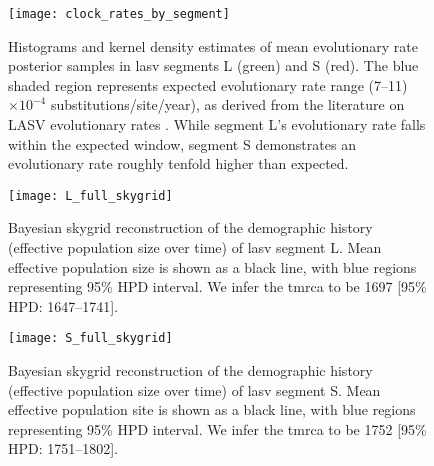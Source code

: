 \begin{figure}[ht]
  \centering
  \medskip
  \texttt{[image: clock\_rates\_by\_segment]}
  \caption[LASV evolutionary rates by segment]{Histograms and kernel density estimates of mean evolutionary rate posterior samples in \gls{lasv} segments L (green) and S (red). The blue shaded region represents expected evolutionary rate range (7--11)$\times10^{-4}$ substitutions/site/year), as derived from the literature on LASV evolutionary rates \cite{andersen2015clinical, fichet2016spatial}. While segment L's evolutionary rate falls within the expected window, segment S demonstrates an evolutionary rate roughly tenfold higher than expected.}
  \label{fig:lassa_clock_rates}
\end{figure}

\begin{figure}[ht]
  \centering
  \medskip
  \texttt{[image: L\_full\_skygrid]}
  \caption[Demographic history of Lassa's L segment]{Bayesian skygrid reconstruction of the demographic history (effective population size over time) of \gls{lasv} segment L. Mean effective population size is shown as a black line, with blue regions representing 95\% HPD interval. We infer the \gls{tmrca} to be 1697 [95\% HPD: 1647--1741].}
  \label{fig:l_skygrid}
\end{figure}

\begin{figure}[ht]
  \centering
  \medskip
  \texttt{[image: S\_full\_skygrid]}
  \caption[Demographic history of Lassa's S segment]{Bayesian skygrid reconstruction of the demographic history (effective population size over time) of \gls{lasv} segment S. Mean effective population site is shown as a black line, with blue regions representing 95\% HPD interval. We infer the \gls{tmrca} to be 1752 [95\% HPD: 1751--1802].}
  \label{fig:s_skygrid}
\end{figure}


\cleardoublepage

